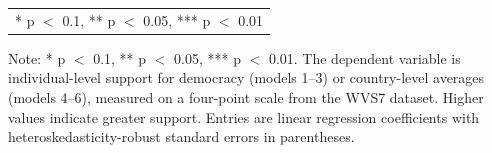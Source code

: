 \begin{table}[!h]
\begin{threeparttable}
\begin{tabular}[t]{lcccccc}
\bottomrule
\multicolumn{7}{l}{\rule{0pt}{1em}* p $<$ 0.1, ** p $<$ 0.05, *** p $<$ 0.01}\\
\end{tabular}
\begin{tablenotes}
\item Note: * p $<$ 0.1, ** p $<$ 0.05, *** p $<$ 0.01. The dependent variable is individual-level support for democracy (models 1--3) or country-level averages (models 4--6), measured on a four-point scale from the WVS7 dataset. Higher values indicate greater support. Entries are linear regression coefficients with heteroskedasticity-robust standard errors in parentheses.
\end{tablenotes}
\end{threeparttable}
\end{table}

